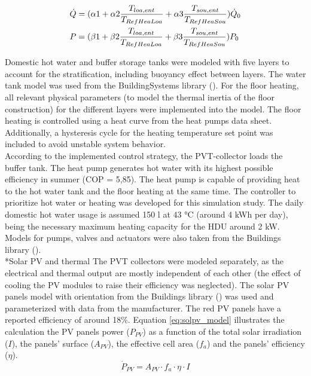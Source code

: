 \documentclass[twocolumn, a4paper,10pt]{article}
\makeatletter
\renewcommand\subsection{\@startsection{subsection}{1}{\z@}{\z@}{\z@}{\normalfont\normalsize\bfseries}}
\renewcommand\subsection{\@startsection{subsection}{1}{\z@}{\z@}{0.1pt}{\normalfont\normalsize\bfseries}}
\makeatother
\begin{document}
\begin{equation}
\begin{aligned}
\vspace{-3pt}
    &\dot{Q} = (\alpha1 + \alpha2 \frac{T_{loa,ent}}{T_{RefHeaLoa}} + \alpha3 \frac{T_{sou,ent}}{T_{RefHeaSou}}) \dot{Q}_0 \\
    &P= (\beta1 + \beta2 \frac{T_{loa,ent}}{T_{RefHeaLoa}} + \beta3 \frac{T_{sou,ent}}{T_{RefHeaSou}}) P_0
\label{eq:HPmodel}
\end{aligned}
\end{equation}

Domestic hot water and buffer storage tanks were modeled with five layers to account for the stratification, including buoyancy effect between layers. The water tank model was used from the BuildingSystems library (\citet{NytschGeusen2012}). For the floor heating, all relevant physical parameters (to model the thermal inertia of the floor construction) for the different layers were implemented into the model. The floor heating is controlled using a heat curve from the heat pumps data sheet. Additionally, a hysteresis cycle for the heating temperature set point was included to avoid unstable system behavior.\\
According to the implemented control strategy, the PVT-collector loads the buffer tank. The heat pump generates hot water with its highest possible efficiency in summer (COP = 5,85). The heat pump is capable of providing heat to the hot water tank and the floor heating at the same time. The controller to prioritize hot water or heating was developed for this simulation study. The daily domestic hot water usage is assumed 150 l at 43 °C (around 4 kWh per day), being the necessary maximum heating capacity for the HDU around 2 kW. Models for pumps, valves and actuators were also taken from the Buildings library (\citet{Wetter2014}).\\

\subsection*{Solar PV and thermal}
The PVT collectors were modeled separately, as the electrical and thermal output are mostly independent of each other (the effect of cooling the PV modules to raise their efficiency was neglected). The solar PV panels model with orientation from the Buildings library (\citet{Wetter2014}) was used and parameterized with data from the manufacturer. The red PV panels have a reported efficiency of around 18\%. Equation \ref{eq:solpv_model} illustrates the calculation the PV panels power ($P_{PV}$) as a function of the total solar irradiation ($I$), the panels' surface ($A_{PV}$), the effective cell area ($f_a$) and the panels' efficiency ($\eta$).\\
\vspace{-1pt}
\begin{equation}
\dot{P}_{PV} = A_{PV} \cdot  f_{a} \cdot \eta \cdot I
\label{eq:solpv_model}
\end{equation}
\end{document}
